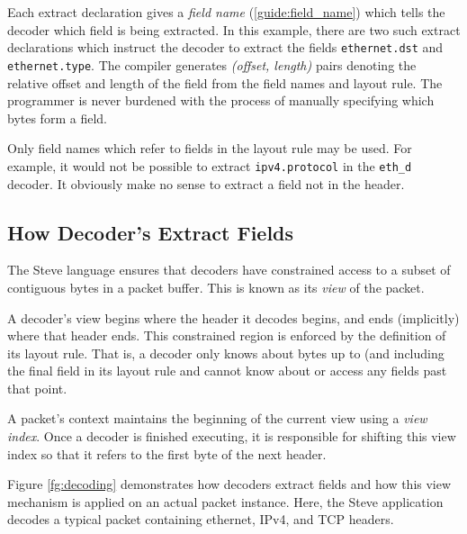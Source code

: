 Each extract declaration gives a \emph{field name} (\ref{guide:field_name}) 
which tells the decoder which field is being extracted. 
In this example, there are
two such extract declarations which instruct the decoder to extract
the fields \texttt{ethernet.dst} and \texttt{ethernet.type}.
The compiler generates \textit{(offset, length)} pairs 
denoting the relative offset and length of the field
from the field names and layout rule. 
The programmer is never burdened with the process of manually specifying
which bytes form a field.

Only field names which refer to fields in the layout rule may be used. For example, it would not be possible to extract \texttt{ipv4.protocol} in the \texttt{eth\_d} decoder. 
It obviously make no sense to extract a field not in the header. 

\subsection{How Decoder's Extract Fields} \label{tut:extract_how}

The Steve language ensures that decoders have constrained
access to a subset of contiguous bytes in a packet buffer.
This is known as its \emph{view} of the packet.

A decoder's view begins where the header it decodes begins, and ends
(implicitly) where that header ends. 
This constrained region is enforced by the definition of its layout rule. 
That is, a decoder only knows about bytes up to (and including the final field in
its layout rule and cannot know about or access any fields past that point.

A packet's context maintains the beginning of the current view using
a \emph{view index}. Once a decoder is finished executing, it is
responsible for shifting this view index so that it refers to the
first byte of the next header.

Figure \ref{fg:decoding} demonstrates how decoders extract fields and
how this view mechanism is applied on an actual packet instance. 
Here, the Steve application decodes a typical packet 
containing ethernet, IPv4, and TCP headers.

